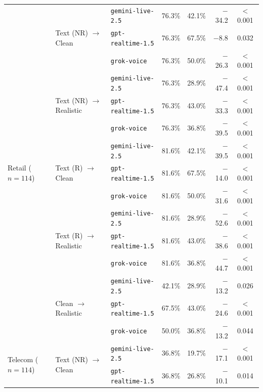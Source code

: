 \begin{tabular}{lllrrrc}
\midrule
\multirow{15}{*}{Retail ($n=114$)}
 & \multirow{3}{*}{Text (NR) $\to$ Clean} & {\color{red!75!black}\texttt{gemini-live-2.5}} & 76.3\% & 42.1\% & $-$34.2 & $<$0.001 \\
 &  & {\color{red!75!black}\texttt{gpt-realtime-1.5}} & 76.3\% & 67.5\% & $-$8.8 & 0.032 \\
 &  & {\color{red!75!black}\texttt{grok-voice}} & 76.3\% & 50.0\% & $-$26.3 & $<$0.001 \\
\cmidrule(l){2-7}
 & \multirow{3}{*}{Text (NR) $\to$ Realistic} & {\color{red!75!black}\texttt{gemini-live-2.5}} & 76.3\% & 28.9\% & $-$47.4 & $<$0.001 \\
 &  & {\color{red!75!black}\texttt{gpt-realtime-1.5}} & 76.3\% & 43.0\% & $-$33.3 & $<$0.001 \\
 &  & {\color{red!75!black}\texttt{grok-voice}} & 76.3\% & 36.8\% & $-$39.5 & $<$0.001 \\
\cmidrule(l){2-7}
 & \multirow{3}{*}{Text (R) $\to$ Clean} & {\color{red!75!black}\texttt{gemini-live-2.5}} & 81.6\% & 42.1\% & $-$39.5 & $<$0.001 \\
 &  & {\color{red!75!black}\texttt{gpt-realtime-1.5}} & 81.6\% & 67.5\% & $-$14.0 & $<$0.001 \\
 &  & {\color{red!75!black}\texttt{grok-voice}} & 81.6\% & 50.0\% & $-$31.6 & $<$0.001 \\
\cmidrule(l){2-7}
 & \multirow{3}{*}{Text (R) $\to$ Realistic} & {\color{red!75!black}\texttt{gemini-live-2.5}} & 81.6\% & 28.9\% & $-$52.6 & $<$0.001 \\
 &  & {\color{red!75!black}\texttt{gpt-realtime-1.5}} & 81.6\% & 43.0\% & $-$38.6 & $<$0.001 \\
 &  & {\color{red!75!black}\texttt{grok-voice}} & 81.6\% & 36.8\% & $-$44.7 & $<$0.001 \\
\cmidrule(l){2-7}
 & \multirow{3}{*}{Clean $\to$ Realistic} & {\color{red!75!black}\texttt{gemini-live-2.5}} & 42.1\% & 28.9\% & $-$13.2 & 0.026 \\
 &  & {\color{red!75!black}\texttt{gpt-realtime-1.5}} & 67.5\% & 43.0\% & $-$24.6 & $<$0.001 \\
 &  & {\color{red!75!black}\texttt{grok-voice}} & 50.0\% & 36.8\% & $-$13.2 & 0.044 \\
\midrule
\multirow{15}{*}{\color{red!75!black}Telecom ($n=114$)}
 & \multirow{3}{*}{Text (NR) $\to$ Clean} & {\color{red!75!black}\texttt{gemini-live-2.5}} & 36.8\% & 19.7\% & $-$17.1 & $<$0.001 \\
 &  & {\color{red!75!black}\texttt{gpt-realtime-1.5}} & 36.8\% & 26.8\% & $-$10.1 & 0.014 \\

\end{tabular}
